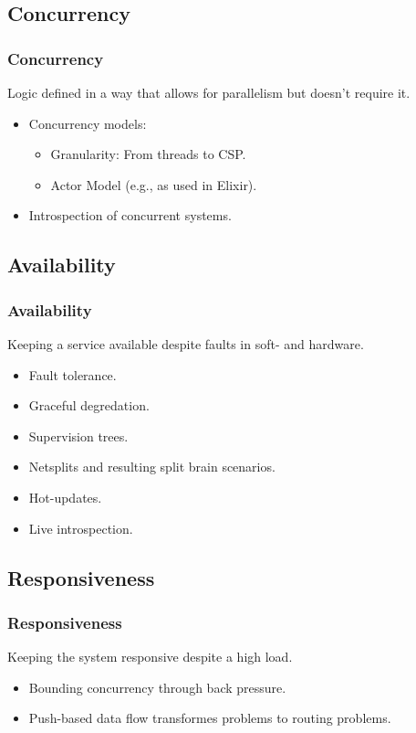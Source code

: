 \subsection{Concurrency}
\begin{frame}
    \frametitle{Concurrency}
    \vspace{0mm}
    Logic defined in a way that allows for parallelism but doesn't require it.
    \vspace{3mm}
    \begin{itemize}
        \item Concurrency models:
          \begin{itemize}
            \item Granularity: From threads to CSP.
            \item Actor Model (e.g., as used in Elixir).
          \end{itemize}
        \item Introspection of concurrent systems.
    \end{itemize}
\end{frame}

\subsection{Availability}
\begin{frame}
    \frametitle{Availability}
    \vspace{0mm}
    Keeping a service available despite faults in soft- and hardware. 
    \vspace{3mm}
    \begin{itemize}
        \item Fault tolerance.
        \item Graceful degredation.
        \item Supervision trees.
        \item Netsplits and resulting split brain scenarios.
        \item Hot-updates.
        \item Live introspection.
    \end{itemize}
\end{frame}

\subsection{Responsiveness}
\begin{frame}
    \frametitle{Responsiveness}
    \vspace{0mm}
    Keeping the system responsive despite a high load.
    \vspace{3mm}
    \begin{itemize}
        \item Bounding concurrency through back pressure.
        \item Push-based data flow transformes problems to routing problems.
    \end{itemize}
\end{frame}

